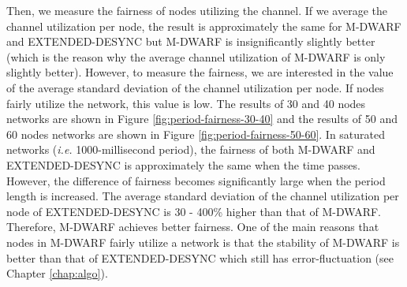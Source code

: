 Then, we measure the fairness of nodes utilizing the channel. If we average the channel utilization per node, the result is approximately the same for M-DWARF and EXTENDED-DESYNC but M-DWARF is insignificantly slightly better (which is the reason why the average channel utilization of M-DWARF is only slightly better). However, to measure the fairness, we are interested in the value of the average standard deviation of the channel utilization per node. If nodes fairly utilize the network, this value is low.
The results of 30 and 40 nodes networks are shown in Figure \ref{fig:period-fairness-30-40} and the results of 50 and 60 nodes networks are shown in Figure \ref{fig:period-fairness-50-60}.
In saturated networks (\textit{i.e.} 1000-millisecond period), the fairness of both M-DWARF and EXTENDED-DESYNC is approximately the same when the time passes. However, the difference of fairness becomes significantly large when the period length is increased. The average standard deviation of the channel utilization per node of EXTENDED-DESYNC is 30 - 400\% higher than that of M-DWARF. Therefore, M-DWARF achieves better fairness. One of the main reasons that nodes in M-DWARF fairly utilize a network is that the stability of M-DWARF is better than that of EXTENDED-DESYNC which still has error-fluctuation (see Chapter \ref{chap:algo}).

